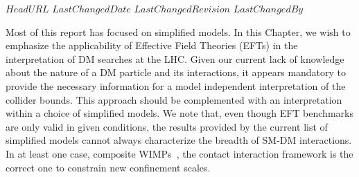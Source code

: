 \svnidlong
{$HeadURL$}
{$LastChangedDate$}
{$LastChangedRevision$}
{$LastChangedBy$}



Most of this report has focused on simplified models.
In this Chapter, we wish to emphasize the applicability of
Effective Field Theories (EFTs) 
in the interpretation of DM searches at the LHC.
Given our current lack of knowledge about the nature of a DM particle and
its interactions, it appears mandatory to provide the necessary information
for a model independent interpretation of the collider bounds.
This approach should be complemented with
an interpretation within a choice of simplified models.
We note that, even though EFT benchmarks are only valid in given conditions,
the results provided by the current list of simplified models cannot always
characterize the breadth of SM-DM interactions.
In at least one case, composite WIMPs~\cite{Nussinov:1985xr,Kaplan:1991ah,Banks:2010eh}, 
the contact interaction framework is the correct one to
constrain new confinement scales. 


